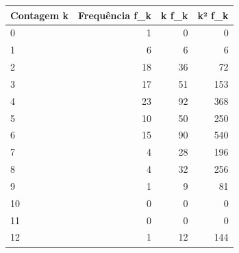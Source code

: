 \begin{tabular}{lrrr}
\toprule
Contagem k & Frequência f\_k & k f\_k & k² f\_k \\
\midrule
0 & 1 & 0 & 0 \\
1 & 6 & 6 & 6 \\
2 & 18 & 36 & 72 \\
3 & 17 & 51 & 153 \\
4 & 23 & 92 & 368 \\
5 & 10 & 50 & 250 \\
6 & 15 & 90 & 540 \\
7 & 4 & 28 & 196 \\
8 & 4 & 32 & 256 \\
9 & 1 & 9 & 81 \\
10 & 0 & 0 & 0 \\
11 & 0 & 0 & 0 \\
12 & 1 & 12 & 144 \\
\bottomrule
\end{tabular}
